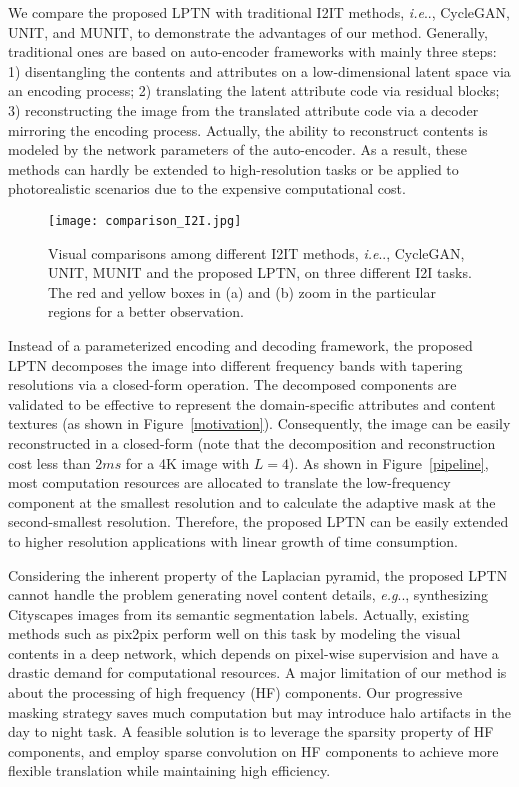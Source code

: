 \documentclass[10pt,twocolumn,letterpaper]{article}
\makeatletter
\DeclareRobustCommand\onedot{\futurelet\@let@token\@onedot}
\def\@onedot{\ifx\@let@token.\else.\null\fi\xspace}
\def\eg{\emph{e.g}\onedot} \def\Eg{\emph{E.g}\onedot}
\def\ie{\emph{i.e}\onedot} \def\Ie{\emph{I.e}\onedot}
\makeatother
\begin{document}
	We compare the proposed LPTN with traditional I2IT methods, \ie, CycleGAN, UNIT, and MUNIT, to demonstrate the advantages of our method. Generally, traditional ones are based on auto-encoder frameworks with mainly three steps: 1) disentangling the contents and attributes on a low-dimensional latent space via an encoding process; 2) translating the latent attribute code via residual blocks; 3) reconstructing the image from the translated attribute code via a decoder mirroring the encoding process. Actually, the ability to reconstruct contents is modeled by the network parameters of the auto-encoder. As a result, these methods can hardly be extended to high-resolution tasks or be applied to photorealistic scenarios due to the expensive computational cost.
	
	\begin{figure*}[t]
		\centering
		\texttt{[image: comparison\_I2I.jpg]}
		\caption{Visual comparisons among different I2IT methods, \ie, CycleGAN, UNIT, MUNIT and the proposed LPTN, on three different I2I tasks. The red and yellow boxes in (a) and (b) zoom in the particular regions for a better observation.
			\label{comparison_I2I}}
	\end{figure*}
	
	
	Instead of a parameterized encoding and decoding framework, the proposed LPTN decomposes the image into different frequency bands with tapering resolutions via a closed-form operation. The decomposed components are validated to be effective to represent the domain-specific attributes and content textures (as shown in Figure~\ref{motivation}). Consequently, the image can be easily reconstructed in a closed-form (note that the decomposition and reconstruction cost less than $2ms$ for a 4K image with $L=4$). As shown in Figure~\ref{pipeline}, most computation resources are allocated to translate the low-frequency component at the smallest resolution and to calculate the adaptive mask at the second-smallest resolution. Therefore, the proposed LPTN can be easily extended to higher resolution applications with linear growth of time consumption.
	
	Considering the inherent property of the Laplacian pyramid, the proposed LPTN cannot handle the problem generating novel content details, \eg, synthesizing Cityscapes images from its semantic segmentation labels. Actually, existing methods such as pix2pix perform well on this task by modeling the visual contents in a deep network, which depends on pixel-wise supervision and have a drastic demand for computational resources. A major limitation of our method is about the processing of high frequency (HF) components. Our progressive masking strategy saves much computation but may introduce halo artifacts in the day to night task. A feasible solution is to leverage the sparsity property of HF components, and employ sparse convolution on HF components to achieve more flexible translation while maintaining high efficiency.
	
\end{document}
